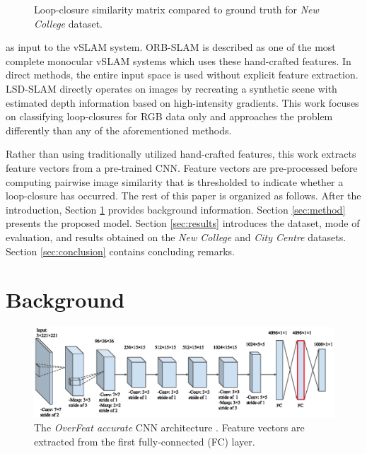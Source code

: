 \documentclass[10pt,twocolumn,letterpaper]{article}
\begin{document}
\begin{figure}
\centering
\caption{Loop-closure similarity matrix compared to ground truth for \textit{New College} dataset.}
\label{fig:new_college_sim}
\end{figure}

as input to the vSLAM system. ORB-SLAM \cite{mur-artal_orb-slam:_2015} is described as one of the most complete monocular vSLAM systems \cite{taketomi_visual_2017} which uses these hand-crafted features. 
In direct methods, the entire input space is used without explicit feature extraction. LSD-SLAM \cite{engel_lsd-slam:_2014} directly operates on images by recreating a synthetic scene with estimated 
depth information based on high-intensity gradients. This work focuses on classifying loop-closures for RGB data only and approaches the problem differently than any of the aforementioned methods.

Rather than using traditionally utilized hand-crafted features, this work extracts feature vectors from a pre-trained CNN. Feature vectors are pre-processed before computing pairwise image similarity 
that is thresholded to indicate whether a loop-closure has occurred. The rest of this paper is organized as follows. After the introduction, Section \ref{sec:background} provides background information. 
Section \ref{sec:method} presents the proposed model. Section \ref{sec:results} introduces the dataset, mode of evaluation, and results obtained on the \textit{New College} and \textit{City Centre} 
datasets. Section \ref{sec:conclusion} contains concluding remarks.

\section{Background}
\label{sec:background}

\begin{figure}
\centering
\includegraphics[width=0.72\linewidth]{DEEPSLAM.eps}
\caption{The \textit{OverFeat accurate} CNN architecture \cite{zhang_loop_2017}. Feature vectors are extracted from the first fully-connected (FC) layer.}
\label{fig:DEEPSLAM}
\end{figure}
\end{document}
